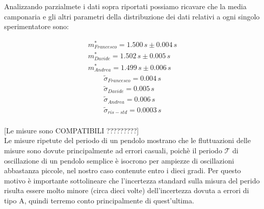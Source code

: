 \documentclass[12pt, twoside, a4paper]{article}
\begin{document}
Analizzando parzialmete i dati sopra riportati possiamo ricavare che la media camponaria e gli altri parametri della distribuzione dei dati relativi a ogni singolo sperimentatore sono:

\begin{equation*}
	\begin{split}
		m_{Francesco}^* = 1.500\,s \pm 0.004\,s \\
		m_{Davide}^* = 1.502\,s \pm 0.005\,s \\
		m_{Andrea}^* = 1.499\,s \pm 0.006\,s
	\end{split}
\end{equation*}
\begin{equation*}
	\begin{split}
		\tilde{\sigma}_{Francesco} = 0.004\,s \\
		\tilde{\sigma}_{Davide} = 0.005\,s \\
		\tilde{\sigma}_{Andrea} = 0.006\,s \\
		\tilde{\sigma}_{ris-std} = 0.0003\,s
	\end{split}
\end{equation*}\\

[Le misure sono COMPATIBILI ?????????]\\

Le misure ripetute del periodo di un pendolo mostrano che le fluttuazioni delle misure sono dovute principalmente ad errori casuali, poichè il periodo $\mathcal{T}$ di oscillazione di un pendolo semplice è isocrono per ampiezze di oscillazioni abbastanza piccole, nel nostro caso contenute entro i dieci gradi.
Per questo motivo è importante sottolineare che l'incertezza standard sulla misura del perido risulta essere molto minore (circa dieci volte) dell'incertezza dovuta a errori di tipo A, quindi terremo conto principalmente di quest'ultima.\\
\end{document}
